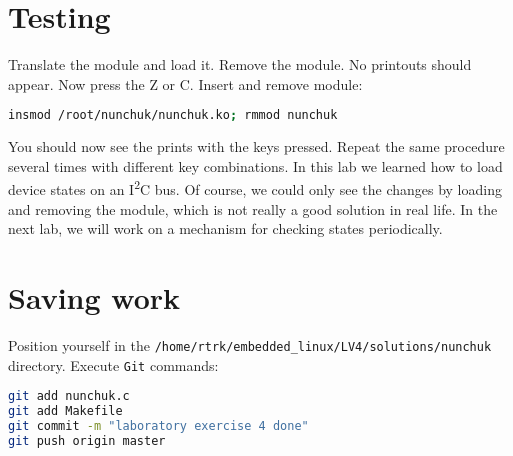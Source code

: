 \documentclass[11pt]{article}
\begin{document}
\section{Testing}
Translate the module and load it. Remove the module. No printouts should appear.
Now press the Z or C. Insert and remove module:
\begin{lstlisting}[language=bash]
insmod /root/nunchuk/nunchuk.ko; rmmod nunchuk
\end{lstlisting}
You should now see the prints with the keys pressed. Repeat the same procedure
several times with different key combinations.
\newline
\newline
In this lab we learned how to load device states on an I\textsuperscript{2}C
bus. Of course, we could only see the changes by loading and removing the
module, which is not really a good solution in real life. In the next lab, we
will work on a mechanism for checking states periodically.

\section{Saving work}
Position yourself in the
\texttt{/home/rtrk/embedded\_linux/LV4/solutions/nunchuk} directory.
Execute \texttt{Git} commands:
\begin{lstlisting}[language=bash]
git add nunchuk.c
git add Makefile
git commit -m "laboratory exercise 4 done"
git push origin master
\end{lstlisting}
\end{document}
